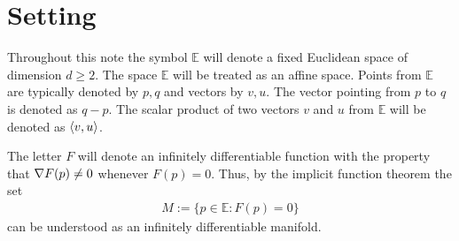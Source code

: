 \section{Setting}

Throughout this note the symbol $ \mathbb{E} $
will denote a fixed Euclidean space of dimension $ d \geq 2 $.
The space $ \mathbb{E} $ will be treated as an affine space.
Points from $ \mathbb{E} $ are typically
denoted by $ p , q $ and vectors by $ v, u $.
The vector pointing from $ p $ to $ q $ is denoted as $ q - p $.
The scalar product of two vectors $ v $ and $ u $ from $ \mathbb{E} $
will be denoted as $ \langle  v ,  u  \rangle $.

The letter $ F $ will denote an infinitely differentiable function
with the property that $ \nabla F( p ) \neq 0 $ whenever $ F( p ) = 0 $.
Thus, by the implicit function theorem the set
\begin{align}
    M  :=  \{ p \in \mathbb{E} : F( p ) = 0 \}
\end{align}
can be understood as an infinitely differentiable manifold.